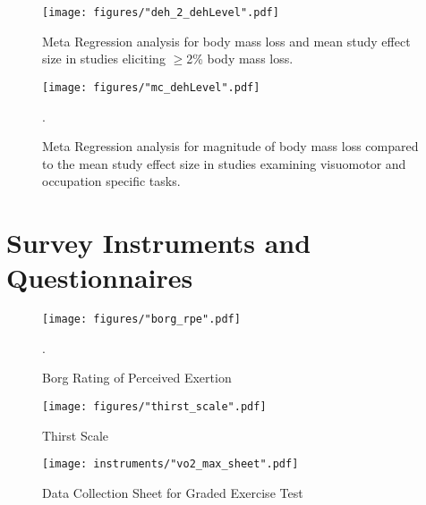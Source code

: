 \begin{appendices}
\begin{figure}
	\centering
	\texttt{[image: figures/"deh\_2\_dehLevel".pdf]}
	\caption{Meta Regression analysis for body mass loss and mean study effect size in studies eliciting ${\geq}$2\% body mass loss.}
	\label{fig:deh_2_dehLevel}
\end{figure}

\begin{figure}
	\centering
	\texttt{[image: figures/"mc\_dehLevel".pdf]}
	\caption{Meta Regression analysis for magnitude of body mass loss compared to the mean study effect size in studies examining visuomotor and occupation specific tasks.}.
	\label{fig:mc_dehLevel}
\end{figure}


\chapter{Survey Instruments and Questionnaires}
%
\begin{figure}
	\centering
	\texttt{[image: figures/"borg\_rpe".pdf]}
	\caption{Borg Rating of Perceived Exertion \cite{borg_psychophysical_1982}}.
	\label{fig:rpe}
\end{figure}


%
\begin{figure}
	\centering
	\texttt{[image: figures/"thirst\_scale".pdf]}
	\caption{Thirst Scale}
	\label{fig:thirst}
\end{figure}

\begin{figure}
	\centering
	\texttt{[image: instruments/"vo2\_max\_sheet".pdf]}
	\caption{Data Collection Sheet for Graded Exercise Test}
	\label{fig:vo2_max}
\end{figure}



\end{appendices}